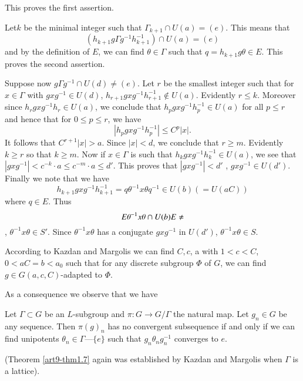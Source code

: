This proves the first assertion.

Let\pageoriginale $k$ be the minimal integer such that $\Gamma_{k+1} \cap U (a) = (e)$. This means that
$$
(h_{k+1} g \Gamma g^{-1} h^{-1}_{k+1}) \cap U (a) = (e)
$$
and by the definition of $E$, we can find $\theta \in \Gamma$ such that $q = h_{k+1} g \theta \in E$. This proves the second assertion.

Suppose now $g \Gamma g^{-1} \cap U (d) \neq (e)$. Let $r$ be the smallest integer such that for $x \in \Gamma$ with $g x g^{-1} \in U (d)$, $h_{r+1} gx g^{-1} h^{-1}_{r+1} \not\in U (a)$. Evidently $r \leqslant k$. Moreover since $h_r g x g^{-1} h_r \in U (a)$, we conclude  that $h_p g x g^{-1} h^{-1}_p \in U (a)$ for all $p \leqslant r$ and hence that for $0 \leqslant p \leqslant r$, we have
$$
|h_p g x g^{-1} h^{-1}_p| \leqslant C^{p} |x|.
$$
It follows that $C^{r+1} |x|>a$. Since $|x|<d$, we conclude that $r \geqslant m$. Evidently $k \geqslant r$ so that $k \geqslant m$. Now if $x \in \Gamma$ is such that $h_k g x g^{-1} h^{-1}_k \in U (a)$, we see that $|g x g^{-1}| < c^{-k} \cdot a \leqslant c^{-m} \cdot a\leqslant d'$. This proves that $|g xg^{-1}| < d'$ \ie, $gxg^{-1} \in U (d')$. Finally we note that we have
$$
h_{k+1} g x g^{-1} h^{-1}_{k+1} = q \theta^{-1} x \theta q^{-1} \in U (b) (= U (aC))
$$
where $q \in E$. Thus
$$
E \theta^{-1} x \theta \cap U (b) E \neq \empty
$$
\ie, $\theta^{-1} x \theta \in S'$. Since $\theta^{-1} x \theta$ has a conjugate $g x g^{-1}$ in $U(d')$, $\theta^{-1} x \theta \in S$.

\begin{remark}\label{art9-rem1.6}
According to Kazdan and Margolis \cite{art9-key1} we can find $C, c$, a with $1 < c < C$, $0 < a C = b < a_0$ such that for any discrete subgroup $\Phi$ of $G$, we can find $g \in G (a, c, C)$-adapted to $\Phi$.
\end{remark}

As a consequence we observe that we have

\begin{theorem}\label{art9-thm1.7}
Let $\Gamma \subset G$ be an $L$-subgroup and $\pi : G \to G/\Gamma$ the natural map. Let $g_n \in G$ be any sequence. Then $\pi(g)_n$ has no convergent subsequence if and only if we can find unipotents $\theta_n \in \Gamma$---$\{e\}$ such that $g_n \theta_n g^{-1}_n$ converges to $e$.
\end{theorem}

(Theorem \ref{art9-thm1.7} again was established by Kazdan and Margolis when $\Gamma$ is a lattice).


